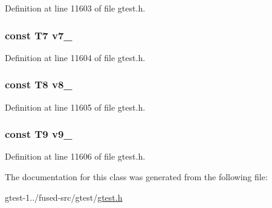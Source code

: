\-Definition at line 11603 of file gtest.\-h.

\hypertarget{classtesting_1_1internal_1_1ValueArray27_a4063f0b7a528133d018ee488ba44a9a3}{
\subsubsection[{v7\-\_\-}]{\setlength{\rightskip}{0pt plus 5cm}const \-T7 {\bf v7\-\_\-}}}\label{d9/ddf/classtesting_1_1internal_1_1ValueArray27_a4063f0b7a528133d018ee488ba44a9a3}


\-Definition at line 11604 of file gtest.\-h.

\hypertarget{classtesting_1_1internal_1_1ValueArray27_a596bc5260b2474271d1f6910ff6f665d}{
\subsubsection[{v8\-\_\-}]{\setlength{\rightskip}{0pt plus 5cm}const \-T8 {\bf v8\-\_\-}}}\label{d9/ddf/classtesting_1_1internal_1_1ValueArray27_a596bc5260b2474271d1f6910ff6f665d}


\-Definition at line 11605 of file gtest.\-h.

\hypertarget{classtesting_1_1internal_1_1ValueArray27_a6356e16cf54a9dfac8525f20242af31e}{
\subsubsection[{v9\-\_\-}]{\setlength{\rightskip}{0pt plus 5cm}const \-T9 {\bf v9\-\_\-}}}\label{d9/ddf/classtesting_1_1internal_1_1ValueArray27_a6356e16cf54a9dfac8525f20242af31e}


\-Definition at line 11606 of file gtest.\-h.



\-The documentation for this class was generated from the following file\-:\begin{DoxyCompactItemize}
\item 
gtest-\/1../fused-\/src/gtest/\hyperlink{fused-src_2gtest_2gtest_8h}{gtest.\-h}\end{DoxyCompactItemize}
